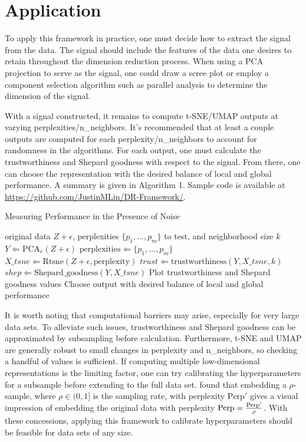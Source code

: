 \documentclass[10pt,letterpaper]{article}
\begin{document}
\section*{Application}
To apply this framework in practice, one must decide how to extract the signal from the data. The signal should include the features of the data one desires to retain throughout the dimension reduction process. When using a PCA projection to serve as the signal, one could draw a scree plot or employ a component selection algorithm such as parallel analysis \cite{parallel analysis} to determine the dimension of the signal.

With a signal constructed, it remains to compute t-SNE/UMAP outputs at varying perplexities/n\_neighbors. It's recommended that at least a couple outputs are computed for each perplexity/n\_neighbors to account for randomness in the algorithms. For each output, one must calculate the trustworthiness and Shepard goodness with respect to the signal. From there, one can choose the representation with the desired balance of local and global performance. A summary is given in Algorithm 1. Sample code is available at \url{https://github.com/JustinMLin/DR-Framework/}.

\begin{algorithm}[!ht]
\caption{Measuring Performance in the Presence of Noise}\label{algo1}
\begin{algorithmic}[1]
\Require original data $Z + \epsilon$, perplexities $\{p_1, \hdots, p_m\}$ to test, and neighborhood size $k$
\State $Y \Leftarrow \textrm{PCA}_r(Z + \epsilon)$
\State $\textrm{perplexities} \Leftarrow \{p_1, \hdots, p_m\}$
	\Loop
		\State $X\_tsne \Leftarrow \textrm{Rtsne}(Z + \epsilon, \textrm{perplexity})$
		\State $trust \Leftarrow \textrm{trustworthiness}(Y, X\_tsne, k)$
		\State $shep \Leftarrow \textrm{Shepard\_goodness}(Y, X\_tsne)$
	\EndLoop
\EndFor
\State Plot trustworthiness and Shepard goodness values
\State Choose output with desired balance of local and global performance
\end{algorithmic}
\end{algorithm}

It is worth noting that computational barriers may arise, especially for very large data sets. To alleviate such issues, trustworthiness and Shepard goodness can be approximated by subsampling before calculation. Furthermore, t-SNE and UMAP are generally robust to small changes in perplexity and n\_neighbors, so checking a handful of values is sufficient. If computing multiple low-dimensional representations is the limiting factor, one can try calibrating the hyperparameters for a subsample before extending to the full data set. \cite{subsample t-SNE} found that embedding a $\rho$-sample, where $\rho \in (0,1]$ is the sampling rate, with perplexity $\textrm{Perp}'$ gives a visual impression of embedding the original data with perplexity $\textrm{\textrm{Perp}} = \frac{\textrm{Perp}'}{\rho}$. With these concessions, applying this framework to calibrate hyperparameters should be feasible for data sets of any size.
\end{document}
